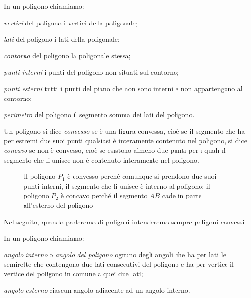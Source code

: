 \begin{definizione}
In un poligono chiamiamo:
\begin{itemize*}
\item \emph{vertici} del poligono i vertici della poligonale;
\item \emph{lati} del poligono i lati della poligonale;
\item \emph{contorno} del poligono la poligonale stessa;
\item \emph{punti interni} i punti del poligono non situati sul contorno;
\item \emph{punti esterni} tutti i punti del piano che non sono interni e non appartengono al contorno;
\item \emph{perimetro} del poligono il segmento somma dei lati del poligono.
\end{itemize*}
\end{definizione}

\begin{definizione}
Un poligono si dice \emph{convesso} se è una figura convessa, cioè se il segmento che ha per estremi due suoi punti qualsiasi è interamente contenuto nel poligono, si dice \emph{concavo} se non è convesso, cioè se esistono almeno due punti per i quali il segmento che li unisce non è contenuto interamente nel poligono.
\end{definizione}

\begin{figure}[htb]
\centering
\caption{Il poligono $P_1$ è convesso perché comunque si prendono due suoi punti interni, il segmento che li unisce è interno al poligono; il poligono $P_2$ è concavo perché il segmento $AB$ cade in parte all'esterno del poligono}
\end{figure}

Nel seguito, quando parleremo di poligoni intenderemo sempre poligoni convessi.

\begin{definizione}
In un poligono chiamiamo:
\begin{itemize*}
\item \emph{angolo interno} o \emph{angolo del poligono} ognuno degli angoli che ha per lati le semirette che contengono due lati consecutivi del poligono e ha per vertice il vertice del poligono in comune a quei due lati;
\item \emph{angolo esterno} ciascun angolo adiacente ad un angolo interno.
\end{itemize*}
\end{definizione}

